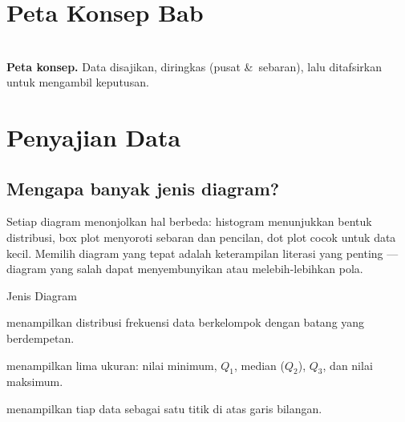 \documentclass[11pt,a4paper]{report}
\theoremstyle{gaya}
\begin{document}
\section*{Peta Konsep Bab}
\begin{center}
\\
\small \textbf{Peta konsep.} Data disajikan, diringkas (pusat \&\ sebaran), lalu ditafsirkan untuk mengambil keputusan.
\end{center}

\section{Penyajian Data}

\subsection*{Mengapa banyak jenis diagram?}
Setiap diagram menonjolkan hal berbeda: histogram menunjukkan bentuk distribusi, box plot menyoroti sebaran dan pencilan, dot plot cocok untuk data kecil. Memilih diagram yang tepat adalah keterampilan literasi yang penting --- diagram yang salah dapat menyembunyikan atau melebih-lebihkan pola.

\begin{konsep}{Jenis Diagram}
\begin{description}[leftmargin=1.5cm,style=nextline]
  \item[Histogram] menampilkan distribusi frekuensi data berkelompok dengan batang yang berdempetan.
  \item[Box plot] menampilkan lima ukuran: nilai minimum, $Q_1$, median ($Q_2$), $Q_3$, dan nilai maksimum.
  \item[Dot plot] menampilkan tiap data sebagai satu titik di atas garis bilangan.
\end{description}
\end{konsep}
\end{document}
